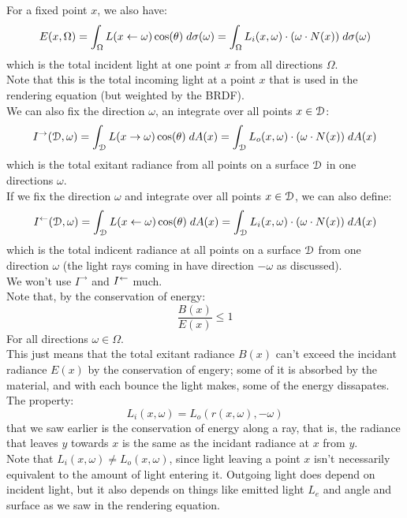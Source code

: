 \documentclass[12pt]{article}
\begin{document}
For a fixed point $x$, we also have:
\[ E(x, \Omega) = \int_\Omega L(x \leftarrow \omega) \cos(\theta) \;
d\sigma(\omega) = \int_\Omega L_i(x, \omega) \cdot 
(\omega \cdot N(x)) \; d\sigma(\omega) \]
which is the total incident light at one point $x$
from all directions $\Omega$. \\
Note that this is the total incoming light
at a point $x$ that is used in the rendering
equation (but weighted by the BRDF). \\

We can also fix the direction $\omega$,
an integrate over all points $x \in \mathcal{D}$:
\[ I^{\to}(\mathcal{D}, \omega) 
= \int_{\mathcal{D}} L(x \to \omega) \cos(\theta) \;
dA(x) = \int_{\mathcal{D}} L_o(x, \omega) \cdot 
(\omega \cdot N(x)) \; dA(x) \]
which is the total exitant radiance from all points
on a surface $\mathcal{D}$ in one directions $\omega$. \\

If we fix the direction $\omega$
and integrate over all points $x \in \mathcal{D}$,
we can also define:
\[ I^{\leftarrow}(\mathcal{D}, \omega) 
= \int_{\mathcal{D}} L(x \leftarrow \omega) \cos(\theta) \;
dA(x) = \int_{\mathcal{D}} L_i(x, \omega) \cdot 
(\omega \cdot N(x)) \; dA(x) \]
which is the total indicent radiance at all points
on a surface $\mathcal{D}$ from one direction $\omega$
(the light rays coming in have direction $-\omega$
as discussed). \\

We won't use $I^{\to}$ and $I^{\leftarrow}$ much. \\

Note that, by the conservation of energy:
\[ \dfrac{B(x)}{E(x)} \leq 1 \]
For all directions $\omega \in \Omega$. \\
This just means that the total exitant radiance $B(x)$
can't exceed the incidant radiance $E(x)$
by the conservation of engery; some of it
is absorbed by the material, and with each bounce
the light makes, some of the energy dissapates. \\

The property:
\[ L_i(x, \omega) = L_o(r(x, \omega), -\omega) \]
that we saw earlier is the conservation of energy
along a ray, that is,
the radiance that leaves $y$ towards $x$
is the same as the incidant radiance
at $x$ from $y$. \\

Note that $L_i(x, \omega) \neq L_o(x, \omega)$,
since light leaving a point $x$ isn't
necessarily equivalent to the amount of light
entering it.
Outgoing light does depend on incident light,
but it also depends on things like emitted light $L_e$
and angle and surface as we saw in 
the rendering equation. \\
\end{document}
